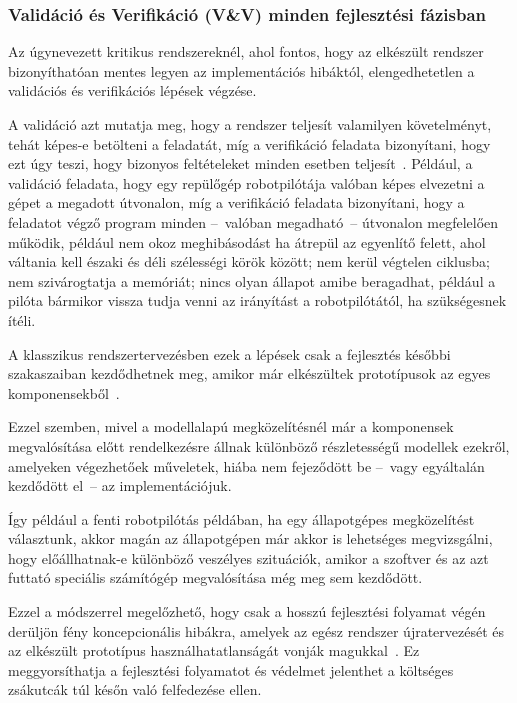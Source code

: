         \subsubsection{Validáció és Verifikáció (V\&V) minden fejlesztési fázisban} \label{sec:VaVmindenutt}
        Az úgynevezett kritikus rendszereknél, ahol fontos, hogy az elkészült rendszer bizonyíthatóan mentes legyen az implementációs hibáktól, elengedhetetlen a validációs és verifikációs lépések végzése.
        
        A validáció azt mutatja meg, hogy a rendszer teljesít valamilyen követelményt, tehát képes-e betölteni a feladatát, míg a verifikáció feladata bizonyítani, hogy ezt úgy teszi, hogy bizonyos feltételeket minden esetben teljesít~\cite{Gianni2017}.
        Például, a validáció feladata, hogy egy repülőgép robotpilótája valóban képes elvezetni a gépet a megadott útvonalon, míg a verifikáció feladata bizonyítani, hogy a feladatot végző program minden --~valóban megadható~-- útvonalon megfelelően működik, például nem okoz meghibásodást ha átrepül az egyenlítő felett, ahol váltania kell északi és déli szélességi körök között; nem kerül végtelen ciklusba; nem szivárogtatja a memóriát; nincs olyan állapot amibe beragadhat, például a pilóta bármikor vissza tudja venni az irányítást a robotpilótától, ha szükségesnek ítéli.
        
        A klasszikus rendszertervezésben ezek a lépések csak a fejlesztés későbbi szakaszaiban kezdődhetnek meg, amikor már elkészültek prototípusok az egyes komponensekből~\cite{Bajaj_2022}.
        
        Ezzel szemben, mivel a modellalapú megközelítésnél már a komponensek megvalósítása előtt rendelkezésre állnak különböző részletességű modellek ezekről, amelyeken végezhetőek műveletek, hiába nem fejeződött be --~vagy egyáltalán kezdődött el~-- az implementációjuk.
        
        Így például a fenti robotpilótás példában, ha egy állapotgépes megközelítést választunk, akkor magán az állapotgépen már akkor is lehetséges megvizsgálni, hogy előállhatnak-e különböző veszélyes szituációk, amikor a szoftver és az azt futtató speciális számítógép megvalósítása még meg sem kezdődött.
        
        Ezzel a módszerrel megelőzhető, hogy csak a hosszú fejlesztési folyamat végén derüljön fény koncepcionális hibákra, amelyek az egész rendszer újratervezését és az elkészült prototípus használhatatlanságát vonják magukkal~\cite{Gianni2017}.
        Ez meggyorsíthatja a fejlesztési folyamatot és védelmet jelenthet a költséges zsákutcák túl későn való felfedezése ellen.
        
